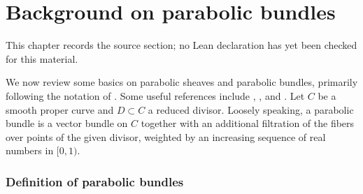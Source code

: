 \chapter{Background on parabolic bundles}
\label{geometric-local-systems-general-curves-isomonodromy-chapter-02}

\begin{remark}
\label{geometric-local-systems-general-curves-isomonodromy-chapter-02-source}
This chapter records the source section; no Lean declaration has yet been checked for this material.
\notready
\end{remark}

\label{section:parabolic}

We now review some basics on parabolic sheaves and parabolic bundles, primarily following the notation of
\cite[\S2.3]{BHH:parabolic}.
Some useful references include
\cite[Part 3, \S1]{seshadri:fibres-vectoriels-sur-les-courbes-algebriques},
\cite[\S1 and \S3]{yokogawa:infinitesimal-deformation}, and
\cite[\S2]{bodenY:moduli-spaces-of-parabolic-higgs-bundles}.
Let $C$ be a smooth proper curve and $D\subset C$ a reduced divisor. Loosely speaking, a parabolic bundle is a vector bundle on $C$ together with an additional
filtration of the fibers over points of the given divisor, weighted by an increasing sequence of real numbers in $[0,1)$.

\subsection{Definition of parabolic bundles}
\label{subsubsection:definition-parabolic}

